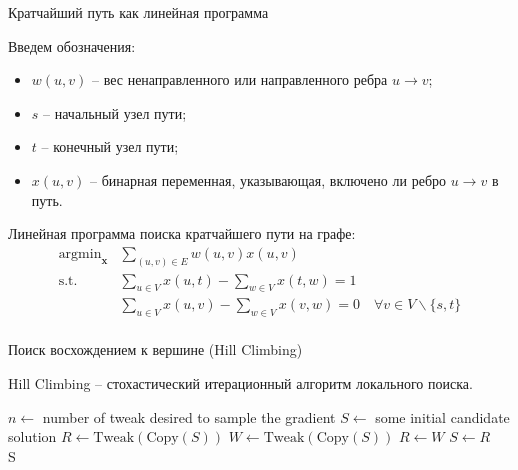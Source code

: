 \documentclass{beamer}
\DeclareMathOperator{\argmin}{argmin}
\begin{document}
\begin{frame}{Кратчайший путь как линейная программа}
    \small

    Введем обозначения:
    \begin{itemize}
        \item $w(u, v)$ -- вес ненаправленного или направленного ребра $u \to v$;
        \item $s$ -- начальный узел пути;
        \item $t$ -- конечный узел пути;
        \item $x(u, v)$ -- бинарная переменная, указывающая, включено ли ребро $u \to v$ в путь.
    \end{itemize}

    Линейная программа поиска кратчайшего пути на графе:
    \begin{align*}
        \argmin_{\bm{x}} &\sum_{(u, v) \in E} w(u, v) x(u, v) \\
        \text{s.t.} &\sum_{u \in V} x(u, t) - \sum_{w \in V} x(t, w) = 1 \\
        &\sum_{u \in V} x(u, v) - \sum_{w \in V} x(v, w) = 0 \quad \forall v \in V \backslash \{s, t\} \\
    \end{align*}
\end{frame}

\begin{frame}{Поиск восхождением к вершине (Hill Climbing)}
    \small

    Hill Climbing -- стохастический итерационный алгоритм локального поиска.

    
\begin{algorithmic}[1]
\State $n \gets $ number of tweak desired to sample the gradient
\State $S \gets $ some initial candidate solution
\Repeat
    \State $R \gets \text{Tweak}(\text{Copy}(S))$
        \State $W \gets \text{Tweak}(\text{Copy}(S))$
            \State $R \gets W$
        \EndIf
    \EndFor
        \State $S \gets R$
    \EndIf
{}\\
\Return S
\end{algorithmic}
\end{frame}
\end{document}

